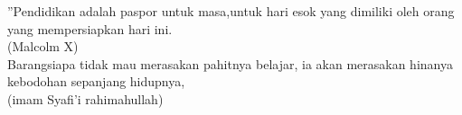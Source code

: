 \begin{dedication}

”Pendidikan adalah paspor untuk masa,untuk hari esok yang dimiliki oleh orang yang mempersiapkan hari ini. \\
(Malcolm X) \\
Barangsiapa tidak mau merasakan pahitnya belajar, ia akan merasakan hinanya kebodohan sepanjang hidupnya, \\ 
(imam Syafi'i rahimahullah) \\

\end{dedication}